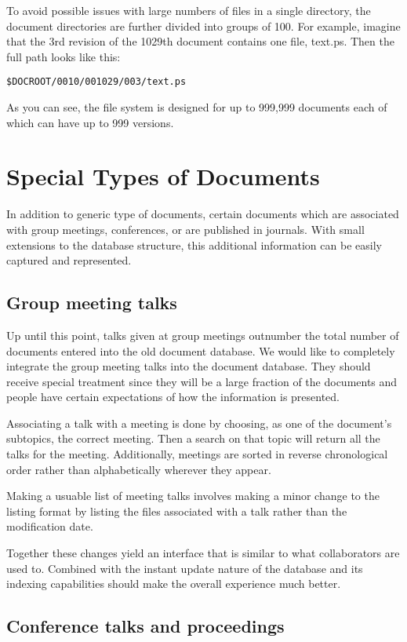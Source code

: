 \documentclass[12pt]{article}
\begin{document}
To avoid possible issues with large numbers of files in a single 
directory, the document directories are further divided into groups of 
100. For example, imagine that the 3rd revision of the 1029th document 
contains one file, text.ps. Then the full path looks like this:

\texttt{\$DOCROOT/0010/001029/003/text.ps}

As you can see, the file system is designed for up to 999,999 documents 
each of which can have up to 999 versions.

\section{Special Types of Documents}

In addition to generic type of documents, certain documents which are
associated with group meetings, conferences, or are published in journals. With
small extensions to the database structure, this additional information can be
easily captured and represented.

\subsection{Group meeting talks}

Up until this point, talks given at group meetings outnumber the total number
of documents entered into the old document database. We would like to
completely integrate the group meeting talks into the document database. They
should receive special treatment since they will be a large fraction of the
documents and people have certain expectations of how the information is
presented.

Associating a talk with a meeting is done by choosing, as one of the document's
subtopics, the correct meeting. Then a search on that topic will return all the
talks for the meeting. Additionally, meetings are sorted in reverse
chronological order rather than alphabetically wherever they appear.

Making a usuable list of meeting talks involves making a minor change to the
listing format by listing the files associated with a talk rather than the
modification date. 

Together these changes yield an interface that is similar to what collaborators
are used to. Combined with the instant update nature of the database and its
indexing capabilities should make the overall experience much better.

\subsection{Conference talks and proceedings}
\end{document}
